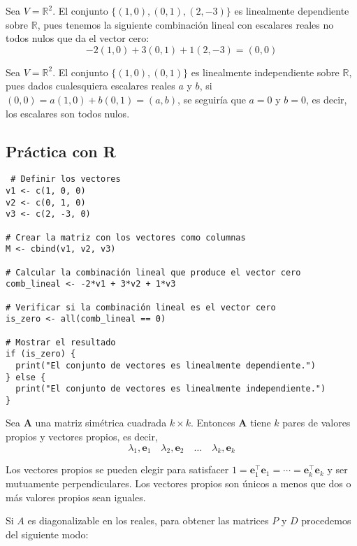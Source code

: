 \begin{}
\begin{definition}
\end{definition}
\begin{example}
Sea \( V = \mathbb{R}^2 \). El conjunto \( \{(1, 0), (0, 1), (2, -3)\} \) es linealmente dependiente sobre \( \mathbb{R} \), pues tenemos la siguiente combinación lineal con escalares reales no todos nulos que da el vector cero:
\[ -2(1, 0) + 3(0, 1) + 1(2, -3) = (0, 0) \]    
\end{example}
\begin{example}
 Sea \( V = \mathbb{R}^2 \). El conjunto \( \{(1, 0), (0, 1)\} \) es linealmente independiente sobre \( \mathbb{R} \), pues dados cualesquiera escalares reales \( a \) y \( b \), si \( (0, 0) = a(1, 0) + b(0, 1) = (a, b) \), se seguiría que \( a = 0 \) y \( b = 0 \), es decir, los escalares son todos nulos.
   
\end{example}
\subsection{Práctica con R}
\begin{verbatim}
 # Definir los vectores
v1 <- c(1, 0, 0)
v2 <- c(0, 1, 0)
v3 <- c(2, -3, 0)

# Crear la matriz con los vectores como columnas
M <- cbind(v1, v2, v3)

# Calcular la combinación lineal que produce el vector cero
comb_lineal <- -2*v1 + 3*v2 + 1*v3

# Verificar si la combinación lineal es el vector cero
is_zero <- all(comb_lineal == 0)

# Mostrar el resultado
if (is_zero) {
  print("El conjunto de vectores es linealmente dependiente.")
} else {
  print("El conjunto de vectores es linealmente independiente.")
}   
\end{verbatim}
\begin{definition}
Sea $\mathbf{A}$ una matriz simétrica cuadrada $k \times k$. Entonces $\mathbf{A}$ tiene $k$ pares de valores propios y vectores propios, es decir,
$$
\lambda_1, \mathbf{e}_1 \quad \lambda_2, \mathbf{e}_2 \quad \ldots \quad \lambda_k, \mathbf{e}_k
$$

Los vectores propios se pueden elegir para satisfacer $1=\mathbf{e}_1^{\top} \mathbf{e}_1=\cdots=\mathbf{e}_k^{\top} \mathbf{e}_k$ y ser mutuamente perpendiculares. Los vectores propios son únicos a menos que dos o más valores propios sean iguales.    
\end{definition}
Si $A$ es diagonalizable en los reales, para obtener las matrices $P$ y $D$ procedemos del siguiente modo:


\end{}
